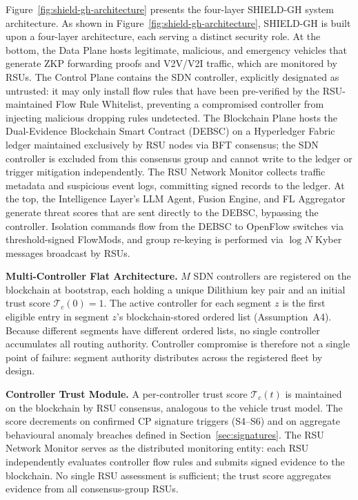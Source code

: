 \documentclass[12pt, a4paper]{report}
\newcommand{\mypar}{\vspace{0.8em}\noindent}
\begin{document}
Figure~\ref{fig:shield-gh-architecture} presents the four-layer SHIELD-GH system architecture. As shown in Figure~\ref{fig:shield-gh-architecture}, SHIELD-GH is built upon a four-layer architecture, each serving a distinct security role. At the bottom, the Data Plane hosts legitimate, malicious, and emergency vehicles that generate ZKP forwarding proofs and V2V/V2I traffic, which are monitored by RSUs. The Control Plane contains the SDN controller, explicitly designated as untrusted: it may only install flow rules that have been pre-verified by the RSU-maintained Flow Rule Whitelist, preventing a compromised controller from injecting malicious dropping rules undetected. The Blockchain Plane hosts the Dual-Evidence Blockchain Smart Contract (DEBSC) on a Hyperledger Fabric ledger maintained exclusively by RSU nodes via BFT consensus; the SDN controller is excluded from this consensus group and cannot write to the ledger or trigger mitigation independently. The RSU Network Monitor collects traffic metadata and suspicious event logs, committing signed records to the ledger. At the top, the Intelligence Layer's LLM Agent, Fusion Engine, and FL Aggregator generate threat scores that are sent directly to the DEBSC, bypassing the controller. Isolation commands flow from the DEBSC to OpenFlow switches via threshold-signed FlowMods, and group re-keying is performed via $\log N$ Kyber messages broadcast by RSUs.

\mypar
\textbf{Multi-Controller Flat Architecture.}
$M$ SDN controllers are registered on the blockchain at bootstrap,
each holding a unique Dilithium key pair and an initial trust score
$\mathcal{T}_c(0)=1$. The active controller for each segment $z$
is the first eligible entry in segment $z$'s blockchain-stored
ordered list (Assumption~A4). Because different segments have
different ordered lists, no single controller accumulates all
routing authority. Controller compromise is therefore not a
single point of failure: segment authority distributes across
the registered fleet by design.

\mypar
\textbf{Controller Trust Module.}
A per-controller trust score $\mathcal{T}_c(t)$ is maintained on
the blockchain by RSU consensus, analogous to the vehicle trust
model. The score decrements on confirmed CP signature triggers
(S4--S6) and on aggregate behavioural anomaly breaches defined in
Section~\ref{sec:signatures}. The RSU Network Monitor serves as
the distributed monitoring entity: each RSU independently
evaluates controller flow rules and submits signed evidence to the
blockchain. No single RSU assessment is sufficient; the trust
score aggregates evidence from all consensus-group RSUs.
\end{document}
